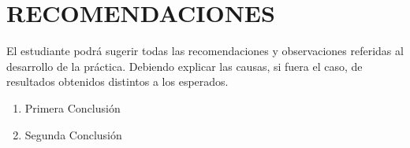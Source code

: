 \chapter*{RECOMENDACIONES}

El estudiante podrá sugerir todas las recomendaciones y observaciones referidas al desarrollo de la práctica. Debiendo explicar las causas, si fuera el caso, de resultados obtenidos distintos a los esperados.

\begin{enumerate}
\item Primera Conclusi\'on
\item Segunda Conclusi\'on
\end{enumerate}